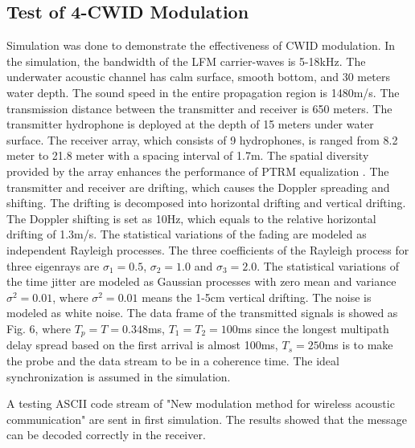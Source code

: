 \documentclass[journal]{IEEEtran}
\begin{document}
\subsection{Test of 4-CWID Modulation}
Simulation was done to demonstrate the effectiveness of CWID
modulation. In the simulation, the bandwidth of the LFM
carrier-waves is 5-18kHz. The underwater acoustic channel has calm
surface, smooth bottom, and 30 meters water depth. The sound speed
in the entire propagation region is 1480m/s. The transmission
distance between the transmitter and receiver is 650 meters. The
transmitter hydrophone is deployed at the depth of 15 meters under
water surface. The receiver array, which consists of 9 hydrophones,
is ranged from 8.2 meter to 21.8 meter with a spacing interval of
1.7m. The spatial diversity provided by the array enhances the
performance of PTRM equalization \cite{Rouseff2001}. The transmitter
and receiver are drifting, which causes the Doppler spreading and
shifting. The drifting is decomposed into horizontal drifting and
vertical drifting. The Doppler shifting is set as 10Hz, which equals
to the relative horizontal drifting of 1.3m/s. The statistical
variations of the fading are modeled as independent Rayleigh
processes. The three coefficients of the Rayleigh process for three
eigenrays are ${\sigma_1}=0.5$, ${\sigma_2}=1.0$ and
${\sigma_3}=2.0$. The statistical variations of the time jitter are
modeled as Gaussian processes with zero mean and variance
${\sigma^2}=0.01$, where ${\sigma^2}=0.01$ means the 1-5cm vertical
drifting. The noise is modeled as white noise. The data frame of the
transmitted signals is showed as Fig. 6, where ${T_p}=T=0.348$ms,
${T_1}={T_2}=100$ms since the longest multipath delay spread based
on the first arrival is almost 100ms, ${T_s}=250$ms is to make the
probe and the data stream to be in a coherence time. The ideal
synchronization is assumed in the simulation.

A testing ASCII code stream of "New modulation method for wireless
acoustic communication" are sent in first simulation. The results
showed that the message can be decoded correctly in the receiver.
\end{document}
